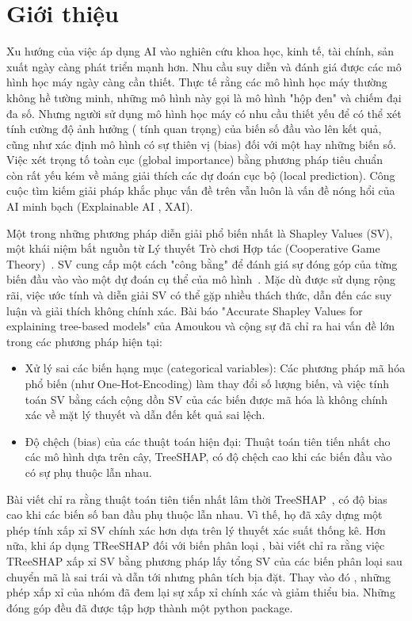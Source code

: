 \documentclass[12pt, a4paper]{article}
\theoremstyle{plain}
\theoremstyle{proposition}
\theoremstyle{lemma}
\begin{document}
\section{Giới thiệu}

Xu hướng của việc áp dụng AI vào nghiên cứu khoa học, kinh tế, tài chính, sản xuất ngày càng phát triển mạnh hơn. Nhu cầu suy diễn và đánh giá được các mô hình học máy ngày càng cần thiết. Thực tế rằng các mô hình học máy thường không hề tường minh, những mô hình này gọi là mô hình "hộp đen" và chiếm đại đa số. Nhưng người sử dụng mô hình học máy có nhu cầu thiết yếu để có thể xét tính cường độ ảnh hưởng ( tính quan trọng) của biến số đầu vào lên kết quả, cũng như xác định mô hình có sự thiên vị (bias) đối với một hay những biến số. Việc xét trọng tố toàn cục (global importance) bằng phương pháp tiêu chuẩn~\citep{strumbelj2010} còn rất yếu kém về mảng giải thích các dự đoán cục bộ (local prediction). Công cuộc tìm kiếm giải pháp khắc phục vấn đề trên vẫn luôn là vấn đề nóng hổi của AI minh bạch (Explainable AI , XAI).

Một trong những phương pháp diễn giải phổ biến nhất là Shapley Values (SV), một khái niệm bắt nguồn từ Lý thuyết Trò chơi Hợp tác (Cooperative Game Theory)~\citep{Shapley1953}. SV cung cấp một cách "công bằng" để đánh giá sự đóng góp của từng biến đầu vào vào một dự đoán cụ thể của mô hình~\citep{breiman2001random}. Mặc dù được sử dụng rộng rãi, việc ước tính và diễn giải SV có thể gặp nhiều thách thức, dẫn đến các suy luận và giải thích không chính xác. Bài báo "Accurate Shapley Values for explaining tree-based models" của Amoukou và cộng sự đã chỉ ra hai vấn đề lớn trong các phương pháp hiện tại:

\begin{itemize}
    \item{Xử lý sai các biến hạng mục (categorical variables): Các phương pháp mã hóa phổ biến (như One-Hot-Encoding) làm thay đổi số lượng biến, và việc tính toán SV bằng cách cộng dồn SV của các biến được mã hóa là không chính xác về mặt lý thuyết và dẫn đến kết quả sai lệch.}
    \item{Độ chệch (bias) của các thuật toán hiện đại: Thuật toán tiên tiến nhất cho các mô hình dựa trên cây, TreeSHAP, có độ chệch cao khi các biến đầu vào có sự phụ thuộc lẫn nhau.}
\end{itemize}

Bài viết chỉ ra rằng thuật toán tiên tiến nhất lâm thời TreeSHAP~\citep{lundbergshap}, có độ bias cao khi các biến số ban đầu phụ thuộc lẫn nhau. Vì thế, họ đã xây dựng một phép tính xấp xỉ SV chính xác hơn dựa trên lý thuyết xác suất thống kê.
Hơn nữa, khi áp dụng TReeSHAP đối với biến phân loại , bài viết chỉ ra rằng việc TReeSHAP xấp xỉ SV bằng phương pháp lấy tổng SV của các biến phân loại sau chuyển mã là sai trái và dẫn tới nhưng phân tích bịa đặt. Thay vào đó , những phép xấp xỉ của nhóm đã đem lại sự xấp xỉ chính xác và giảm thiểu bia. Những đóng góp đều đã được tập hợp thành một python package.
\end{document}
